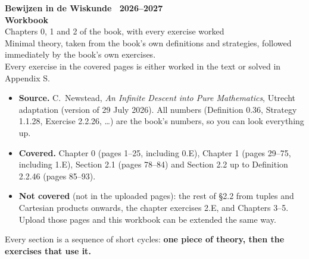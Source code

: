 \thispagestyle{empty}
\begin{tcolorbox}[enhanced, colback=hblue, colframe=hblue, boxrule=0pt, arc=4pt, left=16pt, right=16pt, top=22pt, bottom=22pt]
  \color{white}\sffamily
  {\large\bfseries Bewijzen in de Wiskunde \textperiodcentered\ 2026--2027}\\[10pt]
  {\fontsize{34}{38}\selectfont\bfseries Workbook}\\[6pt]
  {\fontsize{20}{24}\selectfont Chapters 0, 1 and 2 of the book, with every exercise worked}\\[14pt]
  {\normalsize Minimal theory, taken from the book's own definitions and strategies, followed immediately by the book's own exercises.\\
   Every exercise in the covered pages is either worked in the text or solved in Appendix S.}
\end{tcolorbox}

\vspace{10pt}
\begin{tcolorbox}[enhanced, colback=white, colframe=hblue2, boxrule=0.8pt, arc=2pt, left=10pt, right=10pt, top=8pt, bottom=8pt]
\sffamily\small\sloppy
\begin{itemize}[leftmargin=1.2em]
\item \textbf{\textcolor{hblue}{Source.}} C.~Newstead, \emph{An Infinite Descent into Pure Mathematics}, Utrecht adaptation (version of 29 July 2026). All numbers (Definition 0.36, Strategy 1.1.28, Exercise 2.2.26, \dots) are the book's numbers, so you can look everything up.
\item \textbf{\textcolor{hblue}{Covered.}} Chapter 0 (pages 1--25, including 0.E), Chapter 1 (pages 29--75, including 1.E), Section 2.1 (pages 78--84) and Section 2.2 up to Definition 2.2.46 (pages 85--93).
\item \textbf{\textcolor{hblue}{Not covered}} (not in the uploaded pages): the rest of \S2.2 from tuples and Cartesian products onwards, the chapter exercises 2.E, and Chapters 3--5. Upload those pages and this workbook can be extended the same way.
\end{itemize}
\end{tcolorbox}

\vspace{8pt}
Every section is a sequence of short cycles: \textbf{one piece of theory, then the exercises that use it.}


